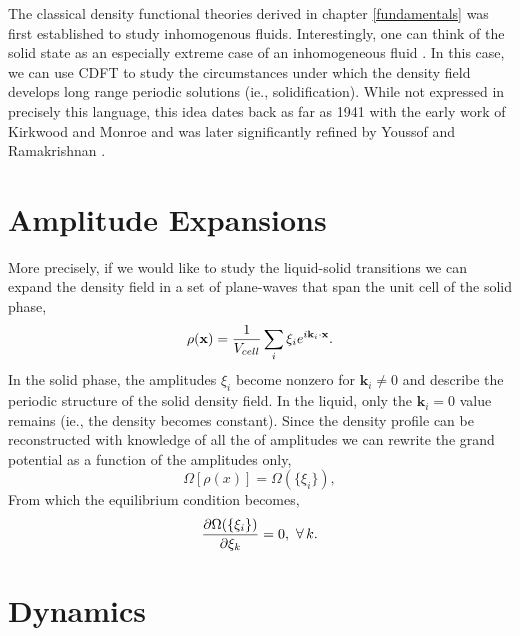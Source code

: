 The classical density functional theories derived in chapter \ref{fundamentals} was first established to study inhomogenous fluids.
Interestingly, one can think of the solid state as an especially extreme case of an inhomogeneous fluid \cite{HANSEN-CH6}.
In this case, we can use CDFT to study the circumstances under which the density field develops long range periodic solutions (ie., solidification).
While not expressed in precisely this language, this idea dates back as far as 1941 with the early work of Kirkwood and Monroe \cite{KIRKWOOD_MONROE41} and was later significantly refined by Youssof and Ramakrishnan \cite{RAMAKRISHNAN79}.

\section{Amplitude Expansions} %

More precisely, if we would like to study the liquid-solid transitions we can expand the density field in a set of plane-waves that span the unit cell of the solid phase,
%
\begin{equation}
    \rho(\mathbf{x}) = \frac{1}{V_{cell}} \sum_i \xi_i e^{i \mathbf{k}_i \cdot \mathbf{x}}.
\end{equation}
%
In the solid phase, the amplitudes $\xi_i$ become nonzero for $\mathbf{k}_i \ne 0$ and describe the periodic structure of the solid density field.
In the liquid, only the $\mathbf{k}_i = 0$ value remains (ie., the density becomes constant).
Since the density profile can be reconstructed with knowledge of all the of amplitudes we can rewrite the grand potential as a function of the amplitudes only, 
%
\begin{equation}
    \Omega[\rho(x)] = \Omega(\lbrace\xi_i\rbrace),
\end{equation}
%
From which the equilibrium condition becomes,
%
\begin{equation}
    \frac{\partial \Omega(\lbrace\xi_i\rbrace)}{\partial \xi_k} = 0, \,\,\forall \,k.
\end{equation}
%

\section{Dynamics} %
